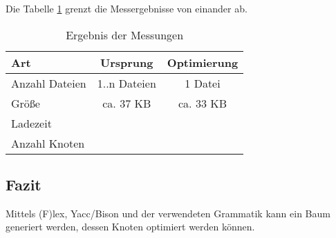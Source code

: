 Die Tabelle \ref{messungen-ergebnis} grenzt die Messergebnisse von einander ab.

\begin{table}[ht!]
	\centering
	\begin{tabular}{l | c | c}
		Art & Ursprung & Optimierung \\
		\hline
		Anzahl Dateien & 1..n Dateien & 1 Datei \\
		Größe & ca. 37 KB & ca. 33 KB \\
		Ladezeit &  & \\
		Anzahl Knoten & & \\
	\end{tabular}
	\caption{Ergebnis der Messungen}
	\label{messungen-ergebnis}
\end{table}

\subsection{Fazit}
Mittels (F)lex, Yacc/Bison und der verwendeten Grammatik kann ein Baum generiert werden, dessen Knoten optimiert werden können. 